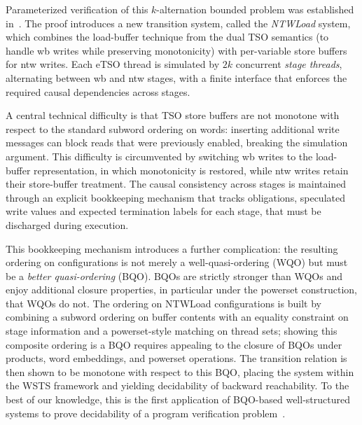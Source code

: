 Parameterized verification of this $k$-alternation bounded problem was
established in~\cite{AABKS25}. The proof introduces a new transition system,
called the \emph{NTWLoad} system, which combines the load-buffer technique
from the dual TSO semantics (to handle wb writes while preserving monotonicity)
with per-variable store buffers for ntw writes. Each eTSO thread is simulated
by $2k$ concurrent \emph{stage threads}, alternating between wb and ntw
stages, with a finite interface that enforces the required causal dependencies
across stages.

A central technical difficulty is that TSO store buffers are not monotone with
respect to the standard subword ordering on words: inserting additional write
messages can block reads that were previously enabled, breaking the simulation
argument. This difficulty is circumvented by switching wb writes to the
load-buffer representation, in which monotonicity is restored, while ntw
writes retain their store-buffer treatment. The causal consistency across
stages is maintained through an explicit bookkeeping mechanism that tracks
obligations, speculated write values and expected termination labels for each
stage, that must be discharged during execution.

This bookkeeping mechanism introduces a further complication: the resulting
ordering on configurations is not merely a well-quasi-ordering (WQO) but must
be a \emph{better quasi-ordering} (BQO). BQOs are strictly stronger than WQOs
and enjoy additional closure properties, in particular under the powerset
construction, that WQOs do not. The ordering on NTWLoad configurations is
built by combining a subword ordering on buffer contents with an equality
constraint on stage information and a powerset-style matching on thread sets;
showing this composite ordering is a BQO requires appealing to the closure of
BQOs under products, word embeddings, and powerset operations. The transition
relation is then shown to be monotone with respect to this BQO, placing the
system within the WSTS framework and yielding decidability of backward
reachability. To the best of our knowledge, this is the first application of
BQO-based well-structured systems to prove decidability of a program
verification problem~\cite{AABKS25}.
